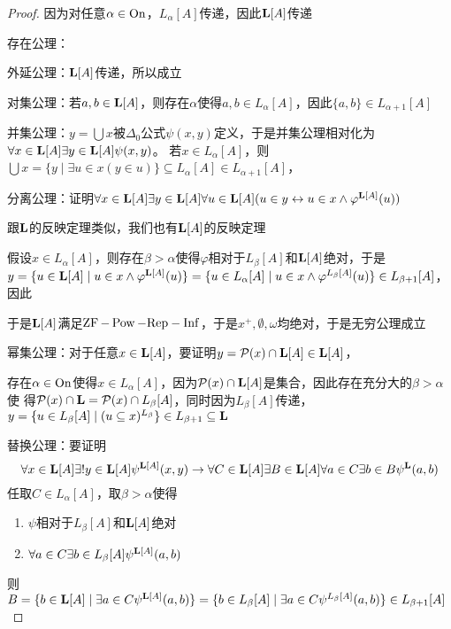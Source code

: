 \documentclass[11pt]{article}
\def \Rep {\text{Rep}}
\begin{document}
\begin{proof}
因为对任意\(\alpha\in\operatorname{On}\)，\(L_\alpha[A]\)传递，因此\(\operatorname{\textbf{L}}[A]\)传递

存在公理：

外延公理：\(\operatorname{\textbf{L}}[A]\)传递，所以成立

对集公理：若\(a,b\in\operatorname{\textbf{L}}[A]\)，则存在\(\alpha\)使得\(a,b\in L_\alpha[A]\)，因此\(\{a,b\}\in L_{\alpha+1}[A]\)

并集公理：\(y=\bigcup x\)被\(\Delta_0\)公式\(\psi(x,y)\)定义，于是并集公理相对化为\(\forall x\in\operatorname{\textbf{L}}[A]\exists y\in\operatorname{\textbf{L}}[A]\psi(x,y)\)。
若\(x\in L_\alpha[A]\)，则\(\bigcup x=\{y\mid\exists u\in x(y\in u)\}\subseteq L_\alpha[A]\in L_{\alpha+1}[A]\)，

分离公理：证明\(\forall x\in\operatorname{\textbf{L}}[A]\exists y\in\operatorname{\textbf{L}}[A]\forall u\in\operatorname{\textbf{L}}[A](u\in y\leftrightarrow u\in x\wedge \varphi^{\operatorname{\textbf{L}}[A]}(u))\)

跟\(\operatorname{\textbf{L}}\)的反映定理类似，我们也有\(\operatorname{\textbf{L}}[A]\)的反映定理

假设\(x\in L_\alpha[A]\)，则存在\(\beta>\alpha\)使得\(\varphi\)相对于\(L_\beta[A]\)和\(\operatorname{\textbf{L}}[A]\)绝对，于是
\(y=\{u\in\operatorname{\textbf{L}}[A]\mid u\in x\wedge \varphi^{\operatorname{\textbf{L}}[A]}(u)\}=\{u\in L_\alpha[A]\mid u\in x\wedge\varphi^{L_\beta[A]}(u)\}\in L_{\beta+1}[A]\)，因此

于是\(\operatorname{\textbf{L}}[A]\)满足\(\ZF-\Pow-\Rep-\Inf\)，于是\(x^+,\emptyset,\omega\)均绝对，于是无穷公理成立

幂集公理：对于任意\(x\in\operatorname{\textbf{L}}[A]\)，要证明\(y=\mathcal{P}(x)\cap\operatorname{\textbf{L}}[A]\in\operatorname{\textbf{L}}[A]\)，

存在\(\alpha\in\operatorname{On}\)使得\(x\in L_\alpha[A]\)，因为\(\mathcal{P}(x)\cap\operatorname{\textbf{L}}[A]\)是集合，因此存在充分大的\(\beta>\alpha\)使
得\(\mathcal{P}(x)\cap\operatorname{\textbf{L}}=\mathcal{P}(x)\cap L_\beta[A]\)，同时因为\(L_\beta[A]\)传递，
\(y=\{u\in L_\beta[A]\mid(u\subseteq x)^{L_\beta}\}\in L_{\beta+1}\subseteq\operatorname{\textbf{L}}\)

替换公理：要证明
\begin{equation*}
\forall x\in\operatorname{\textbf{L}}[A]\exists !y\in\operatorname{\textbf{L}}[A]\psi^{\operatorname{\textbf{L}}[A]}(x,y)\to\forall C\in\operatorname{\textbf{L}}[A]\exists B\in\operatorname{\textbf{L}}[A]\forall a\in C\exists b\in B\psi^{\operatorname{\textbf{L}}}(a,b)
\end{equation*}
任取\(C\in L_\alpha[A]\)，取\(\beta>\alpha\)使得
\begin{enumerate}
\item \(\psi\)相对于\(L_\beta[A]\)和\(\operatorname{\textbf{L}}[A]\)绝对
\item \(\forall a\in C\exists b\in L_\beta[A]\psi^{\operatorname{\textbf{L}}[A]}(a,b)\)
\end{enumerate}
则\(B=\{b\in\operatorname{\textbf{L}}[A]\mid\exists a\in C\psi^{\operatorname{\textbf{L}}[A]}(a,b)\}=\{b\in L_\beta[A]\mid\exists a\in C\psi^{L_\beta[A]}(a,b)\}\in L_{\beta+1}[A]\)
\end{proof}
\end{document}
